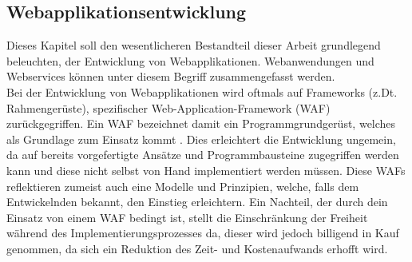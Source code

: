 \subsection{Webapplikationsentwicklung}\label{sec:softwareentwicklung}
Dieses Kapitel soll den wesentlicheren Bestandteil dieser Arbeit grundlegend beleuchten, der Entwicklung von Webapplikationen.
Webanwendungen und Webservices können unter diesem Begriff zusammengefasst werden.
 \\ 
Bei der Entwicklung von Webapplikationen wird oftmals auf Frameworks (z.Dt. Rahmengerüste), spezifischer Web-Application-Framework (WAF) zurückgegriffen. 
Ein WAF bezeichnet damit ein Programmgrundgerüst, welches als Grundlage zum Einsatz kommt \cite{Ionis2019:online}. Dies erleichtert die Entwicklung ungemein, da auf bereits vorgefertigte Ansätze und Programmbausteine zugegriffen werden kann und diese nicht selbst von Hand implementiert werden müssen. Diese WAFs reflektieren zumeist auch eine Modelle und Prinzipien, welche, falls dem Entwickelnden bekannt, den Einstieg erleichtern.  Ein Nachteil, der durch dein Einsatz von einem WAF bedingt ist, stellt die Einschränkung der Freiheit während des Implementierungsprozesses da, dieser wird jedoch billigend in Kauf genommen, da sich ein Reduktion des Zeit- und Kostenaufwands erhofft wird. 

